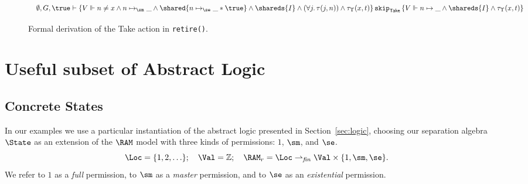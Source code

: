 \begin{figure*}
\begin{small}
\[\begin{array}{c}
{{{{\begin{array}{l}
  \emptyset,G,\true \vdash \{V \Vdash n \neq x \land n \mapsto_{\sm} \_ \land 
  \shared{n \mapsto_{\se} \_ * \true} \land \shareds{I} \land (\forall j.\,\tau(j,n)) \land 
  \tau_{\Upsilon}(x,t) \} 
  \, \mathtt{skip}_{\textsf{Take}} \,  
  \{V \Vdash n \mapsto \_ \land \shareds{I} \land   
  \tau_{\Upsilon}(x,t) \}
\end{array}
}
}
}
}
\end{array}
\]
\end{small}
\caption{Formal derivation of the \textsf{Take} action in \texttt{retire()}.}
\end{figure*}


% 
% 
% 
% 
% 
% 



\section{Useful subset of Abstract Logic\label{sec:perm}} 

\subsection{Concrete States}
In our examples we use a particular instantiation of the abstract logic
presented in Section~\ref{sec:logic}, choosing our separation algebra $\State$ 
as an extension of the $\RAM$ model
with three kinds of permissions: $1$, $\sm$, and $\se$.
$$
\Loc = \{1, 2, \ldots\};
\quad 
\Val = \mathbb{Z};
\quad
\RAM_r 
= \Loc \rightharpoonup_{\it fin} \Val \times \{1,\sm,\se \}.
$$
We refer to $1$ as a \emph{full} permission, to $\sm$ as a \emph{master} permission,
and to $\se$ as an \emph{existential} permission.
 
